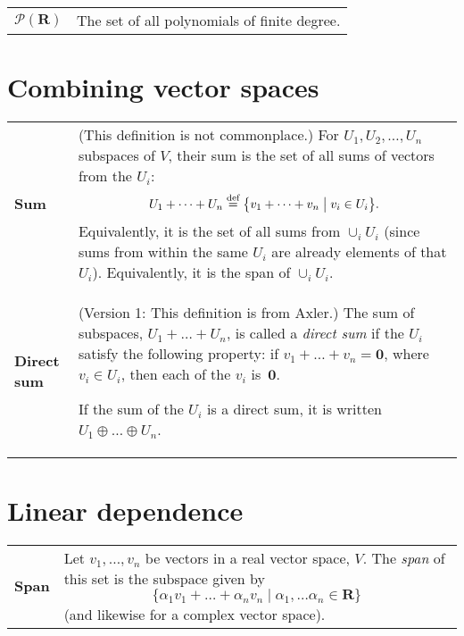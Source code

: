 \documentclass[10pt, a4paper, landscape]{article}
\newcommand{\defn}[1]{\textbf{#1}}
\newcommand{\isdef}{\stackrel{\text{def}}{=}}
\newcommand{\set}[1]{\mathbold{#1}}
\begin{document}
\begin{multicols*}{3}
\begin{tabularx}{\columnwidth}{@{}l>{\raggedright\arraybackslash}X@{}}
  $\mathcal{P}(\set{R})$ & The set of all polynomials of finite degree.

\end{tabularx}


\section*{Combining vector spaces}
\begin{tabularx}{\columnwidth}{@{}l>{\raggedright\arraybackslash}X@{}}
  \toprule
  
  \defn{Sum} & (This definition is not commonplace.) For $U_1, U_2,
  \dotsc, U_n$ subspaces of $V$, their sum is the set of all sums of vectors from the $U_i$:
  \begin{equation*}
    U_1+\dots +U_n \isdef \bigl\{ v_1 + \dots + v_n \bigm\vert v_i \in U_i \bigr\}.
  \end{equation*}
  Equivalently, it is the set of all sums from $\cup_i U_i$ (since sums
  from within the same $U_i$ are already elements of that
  $U_i$). Equivalently, it is the span of $\cup_i U_i$. \\
  
  \defn{Direct sum} & (Version 1: This definition is from Axler.) The
  sum of subspaces, $U_1+\dots + U_n$, is called a \emph{direct sum} if
  the $U_i$ satisfy the following property: if $v_1+\dots +v_n =
  \mathbold{0}$, where $v_i\in U_i$, then each of the $v_i$
  is~$\mathbold{0}$.

  If the sum of the $U_i$ is a direct sum, it is written $U_1\oplus \dots\oplus U_n$. \\
\end{tabularx}

\section*{Linear dependence}
\begin{tabularx}{\columnwidth}{@{}l>{\raggedright\arraybackslash}X@{}}
  \toprule

  \defn{Span} & Let $v_1, \dots, v_n$ be vectors in a real vector space,
  $V$. The \emph{span} of this set is the subspace given by
  \begin{equation*}
    \{ \alpha_1 v_1 +\dots + \alpha_n v_n \mid \alpha_1, \dots \alpha_n\in\set{R} \}
  \end{equation*}
  (and likewise for a complex vector space).


\end{tabularx}
\end{multicols*}
\end{document}
